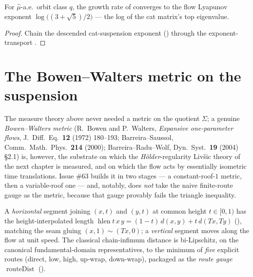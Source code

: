 \begin{theorem}\label{catQuotientFlowCocycle_exponent}
  \leanok
  For $\hat\mu$-a.e.\ orbit class $q$, the growth rate of  converges to
  the flow Lyapunov exponent $\log\!\big((3+\sqrt5)/2\big)$ --- the log of the cat matrix's top
  eigenvalue.
\end{theorem}
\begin{proof}\leanok
  Chain the descended cat-suspension exponent () through the
  exponent-transport .
\end{proof}

\section{The Bowen--Walters metric on the suspension}\label{sec:susp-bowenWalters}

The measure theory above never needed a metric on the quotient $\Sigma$; a genuine
\emph{Bowen--Walters metric} (R.~Bowen and P.~Walters, \emph{Expansive one-parameter flows},
J.~Diff.~Eq.\ \textbf{12} (1972) 180--193; Barreira--Saussol, Comm.~Math.~Phys.\ \textbf{214} (2000);
Barreira--Radu--Wolf, Dyn.~Syst.\ \textbf{19} (2004) \S2.1) is, however, the substrate on which the
\emph{Hölder}-regularity Livšic theory of the next chapter is measured, and on which the flow acts by
essentially isometric time translations. Issue \#63 builds it in two stages --- a constant-roof-$1$
metric, then a variable-roof one --- and, notably, does \emph{not} take the naive finite-route gauge
as the metric, because that gauge provably fails the triangle inequality.

A \emph{horizontal} segment joining $(x, t)$ and $(y, t)$ at common height $t\in[0,1)$ has the
height-interpolated length $\operatorname{hlen} t\,x\,y = (1-t)\,d(x, y) + t\,d(Tx, Ty)$
(), matching the seam gluing $(x, 1)\sim(Tx, 0)$; a \emph{vertical} segment
moves along the flow at unit speed. The classical chain-infimum distance is bi-Lipschitz, on the
canonical fundamental-domain representatives, to the minimum of \emph{five} explicit routes
(direct, low, high, up-wrap, down-wrap), packaged as the \emph{route gauge}
$\operatorname{routeDist}$ ().

